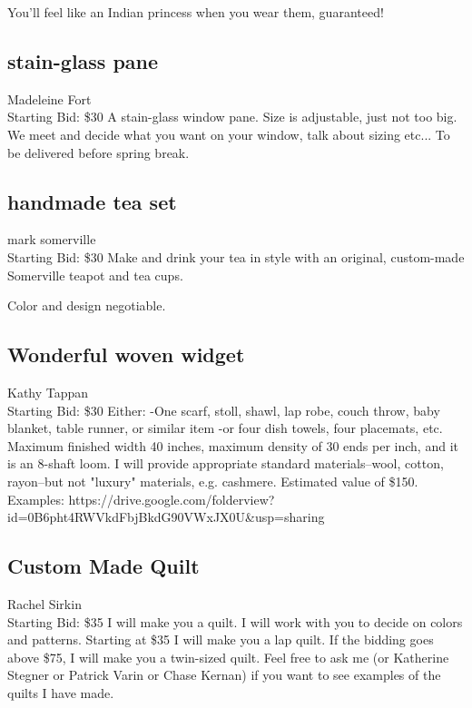 \documentclass[11pt]{article}
\begin{document}
You'll feel like an Indian princess when you wear them, guaranteed!
\subsection{stain-glass pane}
Madeleine Fort
\\
Starting Bid: \$30
\newline
A stain-glass window pane.  Size is adjustable, just not too big.  We meet and decide what you want on your window, talk about sizing etc...  To be delivered before spring break.
\subsection{handmade tea set}
mark somerville
\\
Starting Bid: \$30
\newline
Make and drink your tea in style with an original, custom-made Somerville teapot and tea cups.  

Color and design negotiable.
\subsection{Wonderful woven widget}
Kathy Tappan
\\
Starting Bid: \$30
\newline
Either:
-One scarf, stoll, shawl, lap robe, couch throw, baby blanket, table runner, or similar item
-or four dish towels, four placemats, etc.
Maximum finished width 40 inches, maximum density of 30 ends per inch, and it is an 8-shaft loom.  I will provide appropriate standard materials--wool, cotton, rayon--but not "luxury" materials, e.g. cashmere. Estimated value of \$150. Examples: https://drive.google.com/folderview?id=0B6pht4RWVkdFbjBkdG90VWxJX0U\&usp=sharing
\subsection{Custom Made Quilt}
Rachel Sirkin
\\
Starting Bid: \$35
\newline
I will make you a quilt. I will work with you to decide on colors and patterns. Starting at \$35 I will make you a lap quilt. If the bidding goes above \$75, I will make you a twin-sized quilt. Feel free to ask me (or Katherine Stegner or Patrick Varin or Chase Kernan) if you want to see examples of the quilts I have made.
\end{document}
